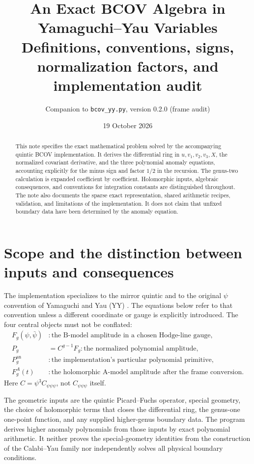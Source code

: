 \documentclass[11pt,a4paper]{article}
\title{An Exact BCOV Algebra in Yamaguchi--Yau Variables\\
\large Definitions, conventions, signs, normalization factors, and implementation audit}
\author{Companion to \texttt{bcov\_yy.py}, version 0.2.0 (frame audit)}
\date{19 October 2026}
\numberwithin{equation}{section}
\newcommand{\an}{\mathrm{an}}
\begin{document}
\maketitle

\begin{abstract}
This note specifies the exact mathematical problem solved by the accompanying
quintic BCOV implementation. It derives the differential ring in
$u,v_1,v_2,v_3,X$, the normalized covariant derivative, and the three polynomial
anomaly equations, accounting explicitly for the minus sign and factor
$1/2$ in the recursion. The genus-two calculation is expanded coefficient by
coefficient. Holomorphic inputs, algebraic consequences, and conventions for
integration constants are distinguished throughout. The note also documents
the sparse exact representation, shared arithmetic recipes, validation, and
limitations of the implementation. It does not claim that unfixed boundary
data have been determined by the anomaly equation.
\end{abstract}

\tableofcontents
\newpage



\section{Scope and the distinction between inputs and consequences}

The implementation specializes to the mirror quintic and to the original
$\psi$ convention of Yamaguchi and Yau (YY) \cite{YY}. The equations below
refer to that convention unless a different coordinate or gauge is explicitly
introduced. The four central objects must not be conflated:
\begin{align}
F_g(\psi,\bar\psi)&:
  \text{the B-model amplitude in a chosen Hodge-line gauge},\\
P_g&=C^{g-1}F_g:
  \text{the normalized polynomial amplitude},\\
P_g^{\an}&:
  \text{the implementation's particular polynomial primitive},\\
F_g^A(t)&:
  \text{the holomorphic A-model amplitude after the frame conversion}.
\end{align}
Here $C=\psi^3 C_{\psi\psi\psi}$, not $C_{\psi\psi\psi}$ itself.

The geometric inputs are the quintic Picard--Fuchs operator, special geometry,
the choice of holomorphic terms that closes the differential ring, the
genus-one one-point function, and any supplied higher-genus boundary data.
The program derives higher anomaly polynomials from those inputs by exact
polynomial arithmetic. It neither proves the special-geometry identities
from the construction of the Calabi--Yau family nor independently solves all
physical boundary conditions.
\end{document}
